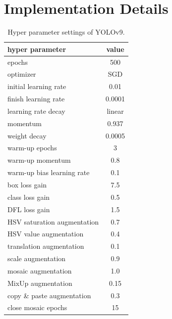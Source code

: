 \documentclass[10pt,twocolumn,letterpaper]{article}
\begin{document}
	\clearpage
	\clearpage
	\clearpage
	
	
	
	\appendix
	
	\setcounter{page}{1}
	\setcounter{table}{0}
	\setcounter{figure}{0}
	
	
	\appendix
	
	\section{Implementation Details}
	
	\begin{table}[h]
		\centering
		\begin{threeparttable}[h]
			\caption{Hyper parameter settings of YOLOv9.}
			\label{table:hyp}
			\begin{tabular}{lc}
				\toprule
				\textbf{hyper parameter} & \textbf{value} \\	
				\midrule
				epochs & 500 \\
				optimizer & SGD \\
				initial learning rate & 0.01 \\
				finish learning rate & 0.0001 \\
				learning rate decay & linear \\
				momentum & 0.937 \\
				weight decay & 0.0005 \\
				warm-up epochs & 3 \\
				warm-up momentum & 0.8 \\
				warm-up bias learning rate & 0.1 \\
				box loss gain & 7.5 \\
				class loss gain & 0.5 \\
				DFL loss gain & 1.5 \\
				HSV saturation augmentation & 0.7 \\
				HSV value augmentation & 0.4 \\
				translation augmentation & 0.1 \\
				scale augmentation & 0.9 \\
				mosaic augmentation & 1.0 \\
				MixUp augmentation & 0.15 \\
				copy \& paste augmentation & 0.3 \\
				close mosaic epochs & 15 \\
				\bottomrule
			\end{tabular}
		\end{threeparttable}
	\end{table}
	
\end{document}
